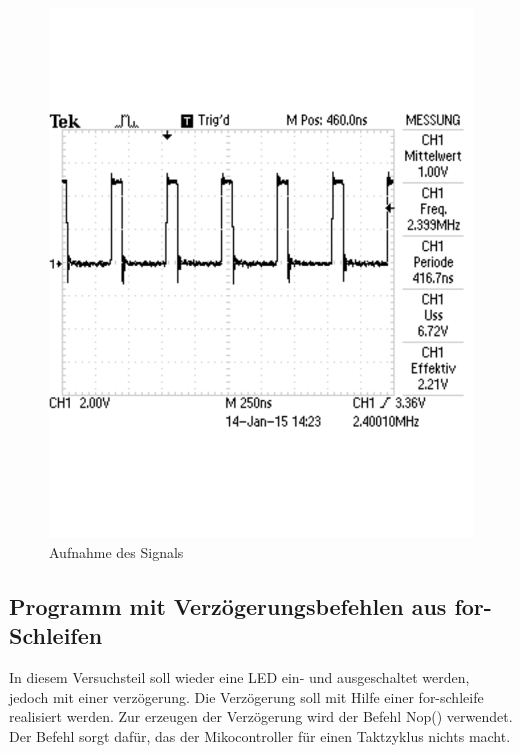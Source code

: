 \documentclass[12pt,a4paper]{article}
\begin{document}
\begin{figure}[H] 
  \centering 	
    \includegraphics[trim = 0mm 50mm 0mm 50mm, clip, scale = 0.4]{TEK0000.pdf}
  	\caption[Aufnahme des Signals]{Aufnahme des Signals} 
  \label{fig:g_1}
\end{figure}



\subsection{Programm mit Verzögerungsbefehlen aus for-Schleifen}

In diesem Versuchsteil soll wieder eine LED ein- und ausgeschaltet werden, jedoch mit einer verzögerung. Die Verzögerung soll mit Hilfe einer for-schleife realisiert werden. Zur erzeugen der Verzögerung wird der Befehl Nop() verwendet. Der Befehl sorgt dafür, das der Mikocontroller für einen Taktzyklus nichts macht.
\end{document}
